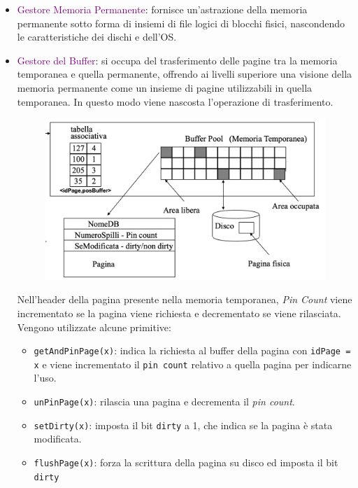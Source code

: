 \begin{itemize}
    \item \textcolor{purple}{Gestore Memoria Permanente}: fornisce un'astrazione della memoria
        permanente sotto forma di insiemi di file logici di blocchi fisici, nascondendo
        le caratteristiche dei dischi e dell'OS.
    \item \textcolor{purple}{Gestore del Buffer}: si occupa del trasferimento delle pagine
        tra la memoria temporanea e quella permanente, offrendo ai livelli superiore
        una visione della memoria permanente come un insieme di pagine utilizzabili in quella temporanea.
        In questo modo viene nascosta l'operazione di trasferimento.
            \begin{figure}[H]
                \centering
                \includegraphics[scale=0.4]{img/buffer.png}
            \end{figure}
        Nell'header della pagina presente nella memoria temporanea, \emph{Pin Count}
        viene incrementato se la pagina viene richiesta e decrementato se viene rilasciata.
        Vengono utilizzate alcune primitive:
        \begin{itemize}
            \item \verb|getAndPinPage(x)|: indica la richiesta al buffer della pagina
                con \verb|idPage = x| e viene incrementato il \verb|pin count| relativo a quella
                pagina per indicarne l'uso.
            \item \verb|unPinPage(x)|: rilascia una pagina e decrementa il \emph{pin count}.
            \item \verb|setDirty(x)|: imposta il bit \verb|dirty| a 1, che indica se la pagina
                è stata modificata.
            \item \verb|flushPage(x)|: forza la scrittura della pagina su disco ed imposta il bit \verb|dirty|

\end{itemize}
\end{itemize}
